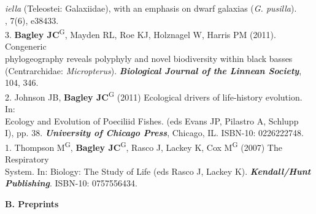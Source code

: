\documentclass[margin,line]{res}
\begin{document}
\begin{resume}
\hspace*{8mm} \emph{iella} (Teleostei: Galaxiidae), with an emphasis on dwarf galaxias (\emph{G. pusilla}).\\ \vspace{2mm}
, 7(6), e38433. \\
3. \textbf{Bagley JC}\textsuperscript{G}, Mayden RL, Roe KJ, Holznagel W, Harris PM (2011). Congeneric\\
\hspace*{8mm} phylogeography reveals polyphyly and novel biodiversity within black basses\\
\hspace*{8mm} (Centrarchidae: \emph{Micropterus}). {\it \textbf{Biological Journal of the Linnean Society}},\\ \vspace{2mm}
\hspace*{8mm}104, 346. \\
2. Johnson JB, \textbf{Bagley JC}\textsuperscript{G} (2011) Ecological drivers of life-history evolution. In:\\
\hspace*{8mm} Ecology and Evolution of Poeciliid Fishes. (eds Evans JP, Pilastro A, Schlupp\\ \vspace{2mm}
\hspace*{8mm} I), pp. 38. {\it \textbf{University of Chicago Press}}, Chicago, IL. ISBN-10: 0226222748. \\
1. Thompson M\textsuperscript{G}, \textbf{Bagley JC}\textsuperscript{G}, Rasco J, Lackey K, Cox M\textsuperscript{G} (2007) The Respiratory\\
\hspace*{8mm} System. In: Biology: The Study of Life (eds Rasco J, Lackey K). {\it \textbf{Kendall/Hunt}\\ 
\hspace*{8mm}\textbf{Publishing}}. ISBN-10: 0757556434. 

\textbf{B. Preprints}%


\end{resume}
\end{document}
